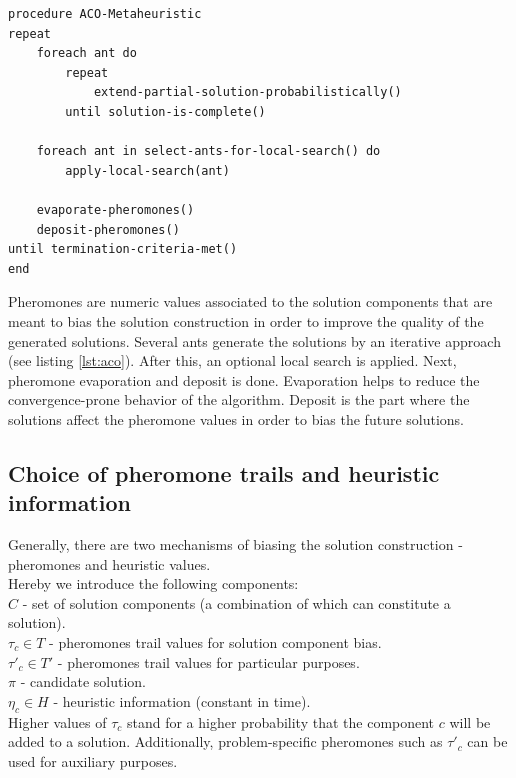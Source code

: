 \documentclass[11pt,a4paper,oneside]{book}
\begin{document}
\begin{minipage}[c]{0.95\textwidth}
\begin{lstlisting}[caption={General ACO pseudo-code}, label={lst:aco}]
procedure ACO-Metaheuristic
repeat
	foreach ant do
		repeat
			extend-partial-solution-probabilistically()
		until solution-is-complete()
	
	foreach ant in select-ants-for-local-search() do
		apply-local-search(ant)
	
	evaporate-pheromones()
	deposit-pheromones()
until termination-criteria-met()
end
\end{lstlisting}
\end{minipage}

Pheromones are numeric values associated to the solution components that are meant to bias the solution construction in order to improve the quality of the generated solutions. Several ants generate the solutions by an iterative approach (see listing \ref{lst:aco}). After this, an optional local search is applied. Next, pheromone evaporation and deposit is done. Evaporation helps to reduce the convergence-prone behavior of the algorithm. Deposit is the part where the solutions affect the pheromone values in order to bias the future solutions.

\subsection{Choice of pheromone trails and heuristic information}

Generally, there are two mechanisms of biasing the solution construction - pheromones and heuristic values. \\
Hereby we introduce the following components: \\
$C$ - set of solution components (a combination of which can constitute a solution). \\
$\tau_c \in T$ - pheromones trail values for solution component bias. \\
$\tau'_c \in T'$ - pheromones trail values for particular purposes. \\
$\pi$ - candidate solution. \\
$\eta_c \in H$ - heuristic information (constant in time). \\

Higher values of $\tau_c$ stand for a higher probability that the component $c$ will be added to a solution. Additionally, problem-specific pheromones such as $\tau'_c$ can be used for auxiliary purposes. 
\end{document}
